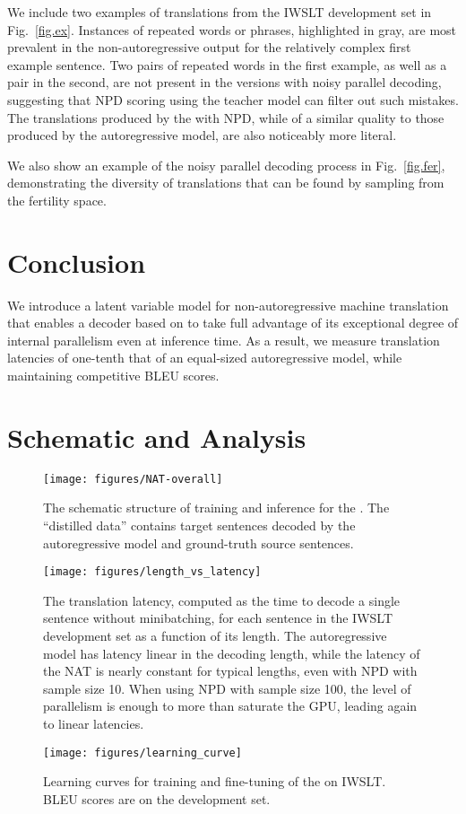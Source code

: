 \documentclass{article} \usepackage{iclr2018_conference,times}
\begin{document}
We include two examples of translations from the IWSLT development set in Fig.~\ref{fig.ex}.
Instances of repeated words or phrases, highlighted in gray, are most prevalent in the non-autoregressive output for the relatively complex first example sentence. Two pairs of repeated words in the first example, as well as a pair in the second, are not present in the versions with noisy parallel decoding, suggesting that NPD scoring using the teacher model can filter out such mistakes. The translations produced by the \model{} with NPD, while of a similar quality to those produced by the autoregressive model, are also noticeably more literal. 

We also show an example of the noisy parallel decoding process in Fig.~\ref{fig.fer}, demonstrating the diversity of translations that can be found by sampling from the fertility space.

\section{Conclusion}
We introduce a latent variable model for non-autoregressive machine translation that enables a decoder based on \citet{vaswani2017attention} to take full advantage of its exceptional degree of internal parallelism even at inference time. As a result, we measure translation latencies of one-tenth that of an equal-sized autoregressive model, while maintaining competitive BLEU scores.





\newpage
\appendix
\section{Schematic and Analysis}


\begin{figure}[htbp]
\centering
\texttt{[image: figures/NAT-overall]}
\caption{The schematic structure of training and inference for the \model. The ``distilled data'' contains target sentences decoded by the autoregressive model and ground-truth source sentences.}
\end{figure}

\begin{figure}[htbp]
\centering
\texttt{[image: figures/length\_vs\_latency]}
\caption{The translation latency, computed as the time to decode a single sentence without minibatching, for each sentence in the IWSLT development set as a function of its length. The autoregressive model has latency linear in the decoding length, while the latency of the NAT is nearly constant for typical lengths, even with NPD with sample size 10. When using NPD with sample size 100, the level of parallelism is enough to more than saturate the GPU, leading again to linear latencies.}
\end{figure}

\begin{figure}[htbp]
\centering
\texttt{[image: figures/learning\_curve]}
\caption{Learning curves for training and fine-tuning of the \model{} on IWSLT. BLEU scores are on the development set.}
\end{figure}
\end{document}
